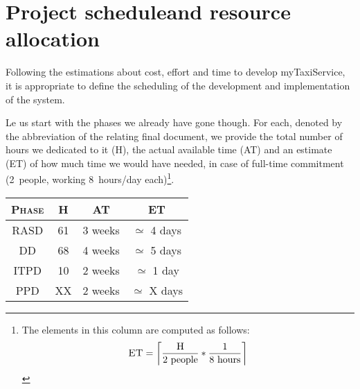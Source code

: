 \chapter[Project schedule and resource allocation]{Project schedule\newline{}and resource allocation}\label{chap:allocation}




Following the estimations about cost, effort and time to develop myTaxiService, it is appropriate to define the scheduling of the development and implementation of the system. 

Le us start with the phases we already have gone though. For each, denoted by the abbreviation of the relating final document, we provide the total number of hours we dedicated to it (\textsc{H}), the actual available time (\textsc{AT}) and an estimate (\textsc{ET}) of how much time we would have needed, in case of full-time commitment (2~people, working 8~hours/day each)\footnote{The elements in this column are computed as follows:{\setlength{\mathindent}{.5cm} \begin{equation*}
	\text{\textsc{ET}} = \left\lceil \frac{\text{\textsc{H}}}{2 \text{ people}} * \frac{1}{8 \text{ hours}} \right\rceil
\end{equation*}}}. 

\begin{table}\centering\begin{tabular}{ >{\ttfamily}c c c c }

\toprule
\normalfont\textsc{Phase} & \normalfont\textsc{H} & \normalfont\textsc{AT} & \normalfont\textsc{ET} \\
\toprule

RASD & 		61 &	3 weeks & 	$\simeq$ 4 days \\\midrule
DD &		68 &	4 weeks & 	$\simeq$ 5 days \\\midrule
ITPD &		10 &	2 weeks &	$\simeq$ 1 day  \\\midrule
PPD &		XX &	2 weeks & 	$\simeq$ X days \\

\bottomrule
	
\end{tabular}
\vspace{\baselineskip}
\end{table}


